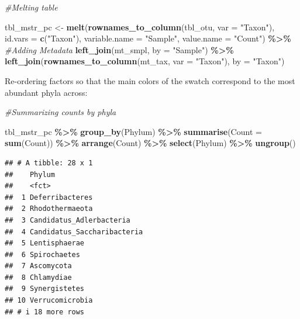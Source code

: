 \documentclass[
]{article}
\newenvironment{Shaded}{\begin{snugshade}}{\end{snugshade}}
\newcommand{\AttributeTok}[1]{\textcolor[rgb]{0.13,0.29,0.53}{#1}}
\newcommand{\CommentTok}[1]{\textcolor[rgb]{0.56,0.35,0.01}{\textit{#1}}}
\newcommand{\FunctionTok}[1]{\textcolor[rgb]{0.13,0.29,0.53}{\textbf{#1}}}
\newcommand{\NormalTok}[1]{#1}
\newcommand{\OtherTok}[1]{\textcolor[rgb]{0.56,0.35,0.01}{#1}}
\newcommand{\SpecialCharTok}[1]{\textcolor[rgb]{0.81,0.36,0.00}{\textbf{#1}}}
\newcommand{\StringTok}[1]{\textcolor[rgb]{0.31,0.60,0.02}{#1}}
\begin{document}
\begin{Shaded}
\begin{Highlighting}[]
\CommentTok{\#Melting table}

\NormalTok{tbl\_mstr\_pc }\OtherTok{\textless{}{-}} \FunctionTok{melt}\NormalTok{(}\FunctionTok{rownames\_to\_column}\NormalTok{(tbl\_otu, }\AttributeTok{var =} \StringTok{"Taxon"}\NormalTok{),}
                 \AttributeTok{id.vars =} \FunctionTok{c}\NormalTok{(}\StringTok{"Taxon"}\NormalTok{),}
                 \AttributeTok{variable.name =} \StringTok{"Sample"}\NormalTok{,}
                 \AttributeTok{value.name =} \StringTok{"Count"}\NormalTok{) }\SpecialCharTok{\%\textgreater{}\%}
\CommentTok{\#Adding Metadata}
            \FunctionTok{left\_join}\NormalTok{(mt\_smpl,}
                      \AttributeTok{by =} \StringTok{"Sample"}\NormalTok{) }\SpecialCharTok{\%\textgreater{}\%}
            \FunctionTok{left\_join}\NormalTok{(}\FunctionTok{rownames\_to\_column}\NormalTok{(mt\_tax, }\AttributeTok{var =} \StringTok{"Taxon"}\NormalTok{),}
                      \AttributeTok{by =} \StringTok{"Taxon"}\NormalTok{)}
\end{Highlighting}
\end{Shaded}

Re-ordering factors so that the main colors of the swatch correspond to
the most abundant phyla across:

\begin{Shaded}
\begin{Highlighting}[]
\CommentTok{\#Summarizing counts by phyla}

\NormalTok{tbl\_mstr\_pc }\SpecialCharTok{\%\textgreater{}\%} 
  \FunctionTok{group\_by}\NormalTok{(Phylum) }\SpecialCharTok{\%\textgreater{}\%} 
  \FunctionTok{summarise}\NormalTok{(}\AttributeTok{Count =} \FunctionTok{sum}\NormalTok{(Count)) }\SpecialCharTok{\%\textgreater{}\%} 
  \FunctionTok{arrange}\NormalTok{(Count) }\SpecialCharTok{\%\textgreater{}\%}
  \FunctionTok{select}\NormalTok{(Phylum) }\SpecialCharTok{\%\textgreater{}\%}
  \FunctionTok{ungroup}\NormalTok{()}
\end{Highlighting}
\end{Shaded}

\begin{verbatim}
## # A tibble: 28 x 1
##    Phylum                     
##    <fct>                      
##  1 Deferribacteres            
##  2 Rhodothermaeota            
##  3 Candidatus_Adlerbacteria   
##  4 Candidatus_Saccharibacteria
##  5 Lentisphaerae              
##  6 Spirochaetes               
##  7 Ascomycota                 
##  8 Chlamydiae                 
##  9 Synergistetes              
## 10 Verrucomicrobia            
## # i 18 more rows
\end{verbatim}
\end{document}
